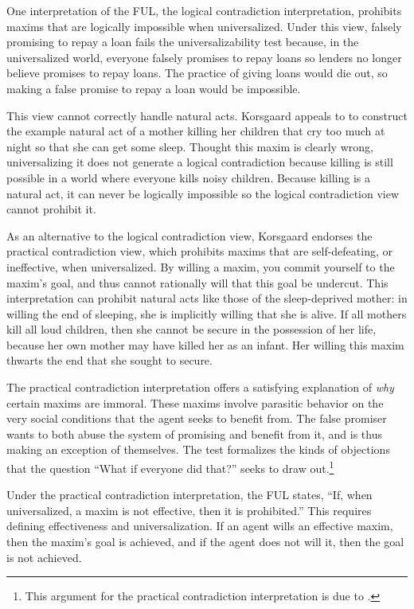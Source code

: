 \begin{isabellebody}
\begin{isamarkuptext}
One interpretation of the FUL, the logical contradiction interpretation, prohibits maxims that are 
logically impossible when universalized. Under this view, falsely promising to repay a loan fails the 
universalizability test because, in the universalized world, everyone falsely promises to repay
loans so lenders no longer believe promises to repay loans. The practice of giving loans would die out, so 
making a false promise to repay a loan would be impossible.

This view cannot correctly handle natural acts. Korsgaard appeals to 
\citet{dietrichson} to construct the example natural act of a mother killing her children that
cry too much at night so that she can get some sleep. Thought this maxim is clearly wrong, universalizing 
it does not generate a logical contradiction because killing is still possible in a world where 
everyone kills noisy children. Because killing is a natural act, it can never be logically 
impossible so the logical contradiction view cannot prohibit it.

As an alternative to the logical contradiction view, Korsgaard endorses the practical contradiction view, 
which prohibits maxims that are self-defeating, or ineffective, when universalized. By willing a maxim, 
you commit yourself to the maxim's goal, and thus cannot rationally will that this goal be 
undercut. This interpretation can prohibit natural acts like those of the sleep-deprived mother: in 
willing the end of sleeping, she is implicitly willing that she is alive. If all mothers kill all 
loud children, then she cannot be secure in the possession of her life, because her own mother may 
have killed her as an infant. Her willing this maxim thwarts the end that she sought to secure. 

The practical contradiction interpretation offers a satisfying explanation of \emph{why} certain 
maxims are immoral. These maxims involve parasitic behavior on the very social conditions that the agent seeks 
to benefit from. The false promiser wants to both abuse the system of promising and benefit 
from it, and is thus making an exception of themselves. The test formalizes the kinds of objections 
that the question ``What if everyone did that?'' seeks to draw out.\footnote{This argument for the practical
contradiction interpretation is due to \citet{KorsgaardFUL}.}

Under the practical contradiction interpretation, the FUL states, ``If, when universalized, a maxim is 
not effective, then it is prohibited.'' This requires defining effectiveness and universalization. 
If an agent wills an effective maxim, then the maxim's goal is achieved, and if the agent does 
not will it, then the goal is not achieved. 


\end{isamarkuptext}
\end{isabellebody}
